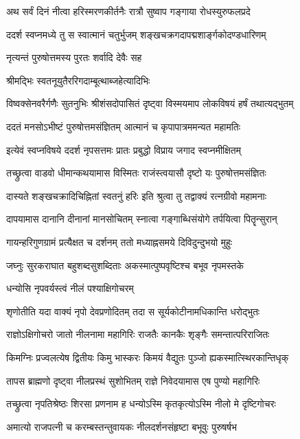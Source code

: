 

\twolineshloka
{अथ सर्वं दिनं नीत्वा हरिस्मरणकीर्तनैः}
{रात्रौ सुष्वाप गङ्गाया रोधस्युरुफलप्रदे}%

\twolineshloka
{ददर्श स्वप्नमध्ये तु स स्वात्मानं चतुर्भुजम्}
{शङ्खचक्रगदापद्मशार्ङ्गकोदण्डधारिणम्}%

नृत्यन्तं पुरुषोत्तमस्य पुरतः शर्वादि देवैः सह

श्रीमद्भिः स्वतनूयुतैररिगदाम्बूत्थाब्जहेत्यादिभिः

\twolineshloka
{विष्वक्सेनवरैर्गणैः सुतनुभिः श्रीशंसदोपासितं}
{दृष्ट्वा विस्मयमाप लोकविषयं हर्षं तथात्यद्भुतम्}%

\twolineshloka
{ददतं मनसोऽभीष्टं पुरुषोत्तमसंज्ञितम्}
{आत्मानं च कृपापात्रममन्यत महामतिः}%

\twolineshloka
{इत्येवं स्वप्नविषये ददर्श नृपसत्तमः}
{प्रातः प्रबुद्धो विप्राय जगाद स्वप्नमीक्षितम्}%

\twolineshloka
{तच्छ्रुत्वा वाडवो धीमान्कथयामास विस्मितः}
{राजंस्त्वयासौ दृष्टो यः पुरुषोत्तमसंज्ञितः}%

\twolineshloka
{दास्यते शङ्खचक्रादिचिह्नितां स्वतनुं हरिः}
{इति श्रुत्वा तु तद्वाक्यं रत्नग्रीवो महामनाः}%

\twolineshloka
{दापयामास दानानि दीनानां मानसोचितम्}
{स्नात्वा गङ्गाब्धिसंयोगे तर्पयित्वा पितॄन्सुरान्}%

\twolineshloka
{गायन्हरिगुणग्रामं प्रत्यैक्षत च दर्शनम्}
{ततो मध्याह्नसमये दिविदुन्दुभयो मुहुः}%

\twolineshloka
{जघ्नुः सुरकराघात बहुशब्दसुशब्दिताः}
{अकस्मात्पुष्पवृष्टिश्च बभूव नृपमस्तके}%

\onelineshloka
{धन्योसि नृपवर्यस्त्वं नीलं पश्याक्षिगोचरम्}%

\twolineshloka
{शृणोतीति यदा वाक्यं नृपो देवप्रणोदितम्}
{तदा स सूर्यकोटीनामधिकान्ति धरोद्भुतः}%

\twolineshloka
{राज्ञोऽक्षिगोचरो जातो नीलनामा महागिरिः}
{राजतैः कानकैः शृङ्गैः समन्तात्परिराजितः}%

\twolineshloka
{किमग्निः प्रज्वलत्येष द्वितीयः किमु भास्करः}
{किमयं वैद्युतः पुञ्जो ह्यकस्मात्स्थिरकान्तिधृक्}%

\twolineshloka
{तापस ब्राह्मणो दृष्ट्वा नीलप्रस्थं सुशोभितम्}
{राज्ञे निवेदयामास एष पुण्यो महागिरिः}%

\twolineshloka
{तच्छ्रुत्वा नृपतिश्रेष्ठः शिरसा प्रणनाम ह}
{धन्योऽस्मि कृतकृत्योऽस्मि नीलो मे दृष्टिगोचरः}%

\twolineshloka
{अमात्यो राजपत्नी च करम्बस्तन्तुवायकः}
{नीलदर्शनसंहृष्टा बभूवुः पुरुषर्षभ}%

